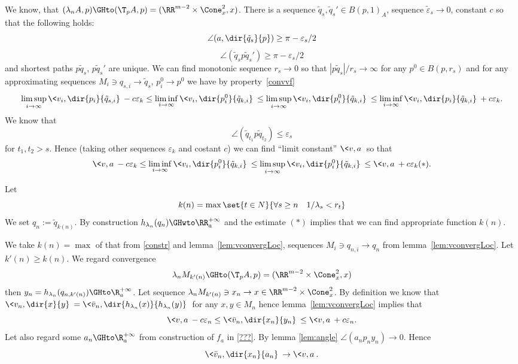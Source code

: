 We know, that $(\lambda_n A, p)\GHto (\T_p A, p)=(\RR^{m-2}\times \Cone_x^2,x)$.
There is a sequence $\tilde q_s, \tilde q_s' \in B(p,1)_A$,
 sequence $\tilde \varepsilon_s\to 0$, constant $c$ so that the following holds:
$$\angle(a,\dir{\tilde q_s}{p})\ge\pi- \varepsilon_s/2$$
 $$\angle(\tilde q_s p\tilde q_s')\ge\pi- \varepsilon_s/2$$
and shortest paths $p\tilde q_s$, $p\tilde q_s'$ are unique.
We can find monotonic sequence $r_s\to 0$ so that $|p\tilde q_s|/r_s\to\infty$
for any $p^0\in B(p,r_s)$
and for any approximating sequences
$M_i\ni q_{s,i}\to \tilde q_s$, $p^0_i\to p^0$ we have by property~\ref{convvf}
$$\limsup_{i\to\infty}  \< v_i,\dir{p_i}{\tilde q_{s,i}}\> -c\varepsilon_k\le
\liminf_{i\to\infty}  \<v_i,\dir{p^0_i}{\tilde q_{k,i}}\>\le\limsup_{i\to\infty}  \< v_i,\dir{p^0_i}{\tilde q_{k,i}}\>
\le\liminf_{i\to\infty}  \<v_i,\dir{p_i}{\tilde q_{k,i}}\> +c\varepsilon_k .
$$
We know that $$\angle(\tilde q_{t_1}p\tilde q_{t_2})\le\varepsilon_s$$ for $t_1, t_2>s$.
Hence (taking other sequences $\varepsilon_k$ and costant $c$)
we can find ``limit constant'' $\<v,a\>$ so that
 $$\<v,a\>-c\varepsilon_k\le
\liminf_{i\to\infty}
\<v_i,\dir{p^0_i}{\tilde q_{k,i}}\>\le\limsup_{i\to\infty}  \< v_i,\dir{p^0_i}{\tilde q_{k,i}}\>
\le\<v,a\> +c\varepsilon_k(*).$$

Let
$$k(n)=\max\set{t\in N}{\forall s\ge n\quad 1/\lambda_s<r_t}$$
We set $q_n:=\tilde q_{k(n)}$.
By construction $h_{\lambda_n}( q_n)\GHwto\RR_a^{+\infty}$
and the estimate $(*)$ implies that we can find appropriate function $k(n)$.
\qeds


We take $k(n)=\max$ of that from \ref{constr}
and lemma~\ref{lem:vconvergLoc},
sequences
$M_i\ni q_{n,i}\to q_n$ from  lemma~\ref{lem:vconvergLoc}.
Let $k'(n)\ge k(n)$.
We regard convergence
$$\lambda_n M_{k'(n)}\GHto (\T_p A, p)=(\RR^{m-2}\times \Cone_x^2,x)$$
then $y_n=h_{\lambda_n}(q_{n, k'(n)})\GHto \R_a^{+\infty} $.
Let sequence $\lambda_n M_{k'(n)}\ni x_n\to x\in \RR^{m-2}\times \Cone_x^2$.
By definition we know that
 $\<v_n,\dir{x}{y}\>=\<\bar v_n, \dir{h_{\lambda_n}(x)}{h_{\lambda_n}(y )}\>$
for any $x,y\in M_n$
hence lemma~\ref{lem:vconvergLoc} implies that
$$\<v,a\>-c\varepsilon_n\le\<\bar v_n,\dir{x_n}{y_n}\>\le\<v,a\>+c\varepsilon_n.$$
Let also regard some
$a_n\GHto \R_a^{+\infty} $ from construction of $f_a$ in \ref{???}.
By lemma \ref{lem:angle}
$\angle (a_n p_n y_n)\to 0$.
Hence
$$\<\bar v_n,\dir{x_n}{a_n}\>\to\<v,a\>.$$
\qeds

